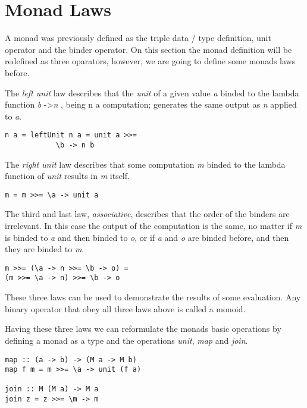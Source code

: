 \documentclass[twocolumn,10pt]{article}
\begin{document}
\section{Monad Laws}
A monad was previously defined as the triple data / type definition, unit operator and the binder operator. On this section the monad definition will be redefined as three oparators, however, we are going to define some monads laws before.

The \textit{left unit} law describes that the \textit{unit} of a given value \textit{a} binded to the lambda function \textit{b} ->\textit{n} , being n a computation; generates the same output as \textit{n} applied to \textit{a}.

\lstset{language=Haskell}
\begin{lstlisting}
n a = leftUnit n a = unit a >>= 
			\b -> n b
\end{lstlisting}

The \textit{right unit} law describes that some computation \textit{m} binded to the lambda function of \textit{unit} results in \textit{m} itself.

\lstset{language=Haskell}
\begin{lstlisting}
m = m >>= \a -> unit a
\end{lstlisting}

The third and last law, \textit{associative}, describes that the order of the binders are irrelevant. In this case the output of the computation is the same, no matter if \textit{m} is binded to \textit{a} and then binded to \textit{o}, or if \textit{a} and \textit{o} are binded before, and then they are binded to \textit{m}.

\lstset{language=Haskell}
\begin{lstlisting}
m >>= (\a -> n >>= \b -> o) = 
(m >>= \a -> n) >>= \b -> o 
\end{lstlisting}

These three laws can be used to demonstrate the results of some evaluation. Any binary operator that obey all three laws above is called a monoid.

Having these three laws we can reformulate the monads basic operations by defining a monad as a type and the operations \textit{unit}, \textit{map} and \textit{join}.

\lstset{language=Haskell}
\begin{lstlisting}
map :: (a -> b) -> (M a -> M b)
map f m = m >>= \a -> unit (f a)

join :: M (M a) -> M a
join z = z >>= \m -> m
\end{lstlisting}
\end{document}
